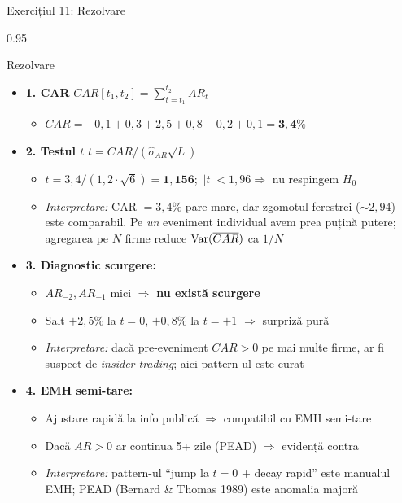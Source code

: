 \documentclass[9pt, aspectratio=169, t]{beamer}
\begin{document}
\begin{frame}[shrink=25]{Exercițiul 11: Rezolvare}
\begin{cminipage}{0.95\textwidth}
\begin{exampleblock}{Rezolvare}
\begin{itemize}\setlength{\itemsep}{0pt}
    \item \textbf{1. CAR} \quad $CAR[t_1, t_2] = \sum_{t=t_1}^{t_2} AR_t$
    \begin{itemize}\setlength{\itemsep}{0pt}
        \item $CAR = -0{,}1 + 0{,}3 + 2{,}5 + 0{,}8 - 0{,}2 + 0{,}1 = \mathbf{3{,}4\%}$
    \end{itemize}
    \item \textbf{2. Testul $t$} \quad $t = CAR / (\hat\sigma_{AR}\sqrt{L})$
    \begin{itemize}\setlength{\itemsep}{0pt}
        \item $t = 3{,}4/(1{,}2 \cdot \sqrt{6}) = \mathbf{1{,}156}$;\ $|t| < 1{,}96 \Rightarrow$ nu respingem $H_0$
        \item \textit{Interpretare:} CAR $= 3{,}4\%$ pare mare, dar zgomotul ferestrei ($\sim 2{,}94$) este comparabil. Pe \emph{un} eveniment individual avem prea puțină putere; agregarea pe $N$ firme reduce $\text{Var}(\overline{CAR})$ ca $1/N$
    \end{itemize}
    \item \textbf{3. Diagnostic scurgere:}
    \begin{itemize}\setlength{\itemsep}{0pt}
        \item $AR_{-2}, AR_{-1}$ mici $\Rightarrow$ \textbf{nu există scurgere}
        \item Salt $+2{,}5\%$ la $t = 0$, $+0{,}8\%$ la $t = +1$ $\Rightarrow$ surpriză pură
        \item \textit{Interpretare:} dacă pre-eveniment $CAR > 0$ pe mai multe firme, ar fi suspect de \emph{insider trading}; aici pattern-ul este curat
    \end{itemize}
    \item \textbf{4. EMH semi-tare:}
    \begin{itemize}\setlength{\itemsep}{0pt}
        \item Ajustare rapidă la info publică $\Rightarrow$ compatibil cu EMH semi-tare
        \item Dacă $AR > 0$ ar continua 5+ zile (PEAD) $\Rightarrow$ evidență contra
        \item \textit{Interpretare:} pattern-ul ``jump la $t = 0$ + decay rapid'' este manualul EMH; PEAD (Bernard \& Thomas 1989) este anomalia majoră
    \end{itemize}
\end{itemize}
\end{exampleblock}
\end{cminipage}
\end{frame}
\end{document}
